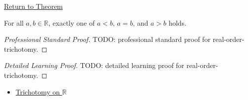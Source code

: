 \newpage
{}
\label{prf:real-order-trichotomy}

\begin{remark*}[Return]
\hyperref[thm:real-order-trichotomy]{Return to Theorem}
\end{remark*}

\begin{theorem*}
For all $a,b\in\mathbb{R}$, exactly one of $a<b$, $a=b$, and $a>b$ holds.
\end{theorem*}

\begin{proof}[Professional Standard Proof]
\LRAProofBodyStart
TODO: professional standard proof for real-order-trichotomy.
\end{proof}

\begin{proof}[Detailed Learning Proof]
\LRAProofBodyStart
TODO: detailed learning proof for real-order-trichotomy.
\end{proof}

\begin{remark*}
\end{remark*}

\begin{dependencies}
\begin{itemize}
  \item \hyperref[thm:trichotomy-on-r]{Trichotomy on $\mathbb{R}$}
\end{itemize}
\end{dependencies}

\clearpage


